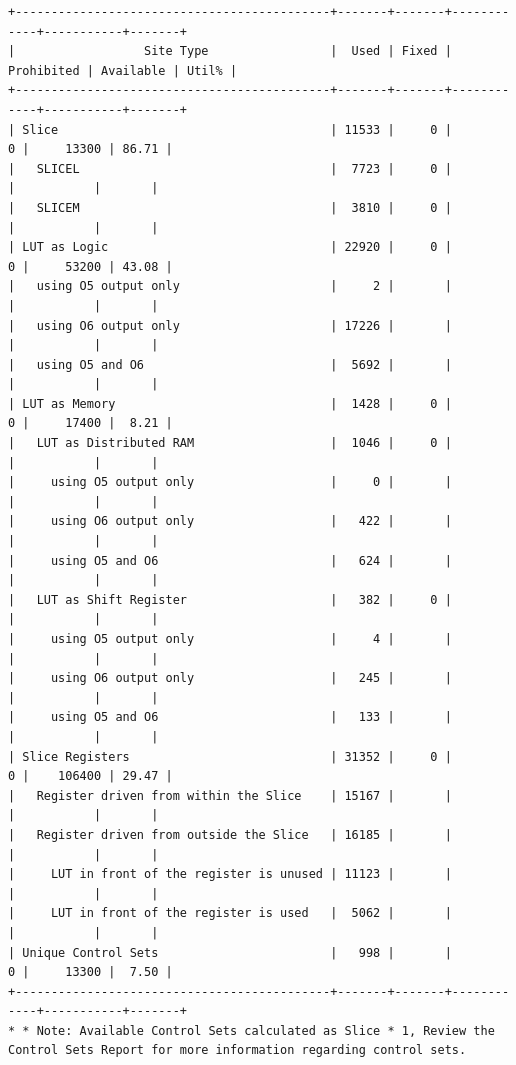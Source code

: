 \documentclass[11pt]{article}
\begin{document}
{\footnotesize
\begin{verbatim}
+--------------------------------------------+-------+-------+------------+-----------+-------+
|                  Site Type                 |  Used | Fixed | Prohibited | Available | Util% |
+--------------------------------------------+-------+-------+------------+-----------+-------+
| Slice                                      | 11533 |     0 |          0 |     13300 | 86.71 |
|   SLICEL                                   |  7723 |     0 |            |           |       |
|   SLICEM                                   |  3810 |     0 |            |           |       |
| LUT as Logic                               | 22920 |     0 |          0 |     53200 | 43.08 |
|   using O5 output only                     |     2 |       |            |           |       |
|   using O6 output only                     | 17226 |       |            |           |       |
|   using O5 and O6                          |  5692 |       |            |           |       |
| LUT as Memory                              |  1428 |     0 |          0 |     17400 |  8.21 |
|   LUT as Distributed RAM                   |  1046 |     0 |            |           |       |
|     using O5 output only                   |     0 |       |            |           |       |
|     using O6 output only                   |   422 |       |            |           |       |
|     using O5 and O6                        |   624 |       |            |           |       |
|   LUT as Shift Register                    |   382 |     0 |            |           |       |
|     using O5 output only                   |     4 |       |            |           |       |
|     using O6 output only                   |   245 |       |            |           |       |
|     using O5 and O6                        |   133 |       |            |           |       |
| Slice Registers                            | 31352 |     0 |          0 |    106400 | 29.47 |
|   Register driven from within the Slice    | 15167 |       |            |           |       |
|   Register driven from outside the Slice   | 16185 |       |            |           |       |
|     LUT in front of the register is unused | 11123 |       |            |           |       |
|     LUT in front of the register is used   |  5062 |       |            |           |       |
| Unique Control Sets                        |   998 |       |          0 |     13300 |  7.50 |
+--------------------------------------------+-------+-------+------------+-----------+-------+
* * Note: Available Control Sets calculated as Slice * 1, Review the Control Sets Report for more information regarding control sets.
\end{verbatim}
}
\end{document}
